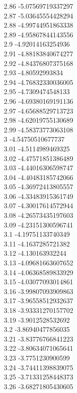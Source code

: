 {2.86	-5.07569719337297\\
2.87	-5.03645554428294\\
2.88	-4.99744951863338\\
2.89	-4.95867844143556\\
2.9	-4.92014163254936\\
2.91	-4.88183840674277\\
2.92	-4.84376807375168\\
2.93	-4.80592993834\\
2.94	-4.76832330036005\\
2.95	-4.7309474548133\\
2.96	-4.69380169191136\\
2.97	-4.65688529713723\\
2.98	-4.62019755130689\\
2.99	-4.58373773063108\\
3	-4.54750510677737\\
3.01	-4.5114989469325\\
3.02	-4.47571851386489\\
3.03	-4.44016306598747\\
3.04	-4.40483185742066\\
3.05	-4.36972413805557\\
3.06	-4.33483915361749\\
3.07	-4.30017614572944\\
3.08	-4.26573435197603\\
3.09	-4.23151300596741\\
3.1	-4.19751133740349\\
3.11	-4.1637285721382\\
3.12	-4.130163932244\\
3.13	-4.09681663607652\\
3.14	-4.06368589833929\\
3.15	-4.03077093014861\\
3.16	-3.99807093909863\\
3.17	-3.96558512932637\\
3.18	-3.93331270157702\\
3.19	-3.9012528532692\\
3.2	-3.86940477856035\\
3.21	-3.83776766841223\\
3.22	-3.80634071065641\\
3.23	-3.7751230900599\\
3.24	-3.74411398839075\\
3.25	-3.71331258448373\\
3.26	-3.68271805430605\\
}
